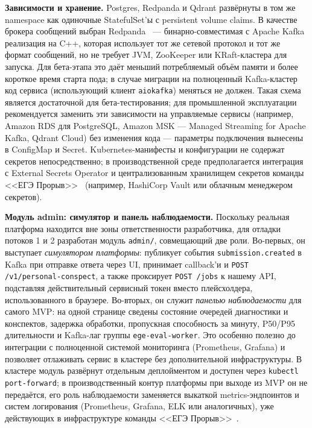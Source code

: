 \documentclass[a4paper,12pt]{extarticle}
\newcommand{\code}[1]{\texttt{\seqsplit{#1}}}
\begin{document}
\textbf{Зависимости и хранение.} Postgres, Redpanda и Qdrant развёрнуты в том
же namespace как одиночные StatefulSet'ы с persistent volume claims. В качестве
брокера сообщений выбран Redpanda~\cite{redpanda2024} --- бинарно-совместимая с
Apache Kafka реализация на C++, которая использует тот же сетевой протокол и тот
же формат сообщений, но не требует JVM, ZooKeeper или KRaft-кластера для
запуска. Для бета-этапа это даёт меньший потребляемый объём памяти и более
короткое время старта пода; в случае миграции на полноценный Kafka-кластер код
сервиса (использующий клиент \texttt{aiokafka}) меняться не должен. Такая схема
является достаточной для бета-тестирования; для промышленной эксплуатации
рекомендуется заменить эти зависимости на управляемые сервисы (например, Amazon
RDS для PostgreSQL, Amazon MSK --- Managed Streaming for Apache Kafka, Qdrant
Cloud) без изменения кода --- параметры подключения вынесены в ConfigMap и Secret.
Kubernetes-манифесты и конфигурации не содержат секретов непосредственно; в
производственной среде предполагается интеграция с External Secrets Operator
и централизованным хранилищем секретов команды <<ЕГЭ Прорыв>>~\cite{exambreakout2026} (например, HashiCorp
Vault или облачным менеджером секретов).

\textbf{Модуль admin: симулятор и панель наблюдаемости.} Поскольку реальная
платформа находится вне зоны ответственности разработчика, для отладки потоков
1 и 2 разработан модуль \texttt{admin/}, совмещающий две роли. Во-первых, он
выступает \textit{симулятором платформы}: публикует события
\texttt{submission.created} в Kafka при отправке ответа через UI, принимает
callback'и \code{POST /v1/submissions/\{id\}/diagnostic-tags} и
\texttt{POST /v1/personal-conspect}, а также проксирует \texttt{POST /jobs}
к нашему API, подставляя действительный сервисный токен вместо плейсхолдера,
использованного в браузере. Во-вторых, он служит \textit{панелью наблюдаемости}
для самого MVP: на одной странице сведены состояние очередей диагностики и
конспектов, задержка обработки, пропускная способность за минуту, P50/P95
длительности и Kafka-лаг группы \texttt{ege-eval-worker}. Это особенно полезно
до интеграции с полноценной системой мониторинга (Prometheus, Grafana) и
позволяет отлаживать сервис в кластере без дополнительной инфраструктуры.
В кластере модуль развёрнут отдельным деплойментом и доступен через
\texttt{kubectl port-forward}; в производственный контур платформы при выходе
из MVP он не передаётся, его роль наблюдаемости заменяется выкаткой
metrics-эндпоинтов и систем логирования (Prometheus, Grafana, ELK или
аналогичных), уже действующих в инфраструктуре команды <<ЕГЭ Прорыв>>~\cite{exambreakout2026}.
\end{document}
